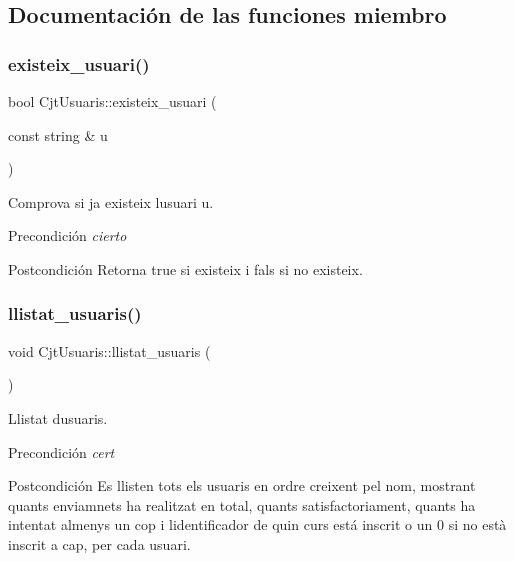 \subsection{Documentación de las funciones miembro}
\mbox{\label{class_cjt_usuaris_a303a749394c11243fdd3c9b6c11d85bc}} 
\subsubsection{\texorpdfstring{existeix\+\_\+usuari()}{existeix\_usuari()}}
{\footnotesize\ttfamily bool Cjt\+Usuaris\+::existeix\+\_\+usuari (\begin{DoxyParamCaption}\item[{const string \&}]{u }\end{DoxyParamCaption})}



Comprova si ja existeix l\textquotesingle{}usuari u. 

\begin{DoxyPrecond}{Precondición}
{\itshape cierto} 
\end{DoxyPrecond}
\begin{DoxyPostcond}{Postcondición}
Retorna true si existeix i fals si no existeix. 
\end{DoxyPostcond}
\mbox{\label{class_cjt_usuaris_a28020e6e834b3c483198285fb35436fc}} 
\subsubsection{\texorpdfstring{llistat\+\_\+usuaris()}{llistat\_usuaris()}}
{\footnotesize\ttfamily void Cjt\+Usuaris\+::llistat\+\_\+usuaris (\begin{DoxyParamCaption}{ }\end{DoxyParamCaption})}



Llistat d\textquotesingle{}usuaris. 

\begin{DoxyPrecond}{Precondición}
{\itshape cert} 
\end{DoxyPrecond}
\begin{DoxyPostcond}{Postcondición}
Es llisten tots els usuaris en ordre creixent pel nom, mostrant quants enviamnets ha realitzat en total, quants satisfactoriament, quants ha intentat almenys un cop i l\textquotesingle{}identificador de quin curs está inscrit o un 0 si no està inscrit a cap, per cada usuari. 
\end{DoxyPostcond}
\mbox{\label{class_cjt_usuaris_a96d96217021a8ededacc5f89cec9b04a}} 
